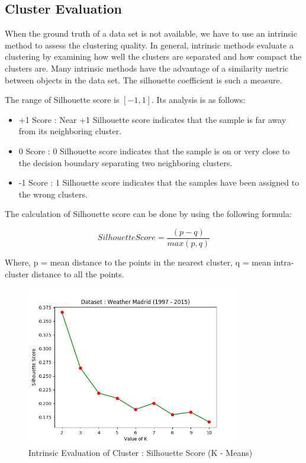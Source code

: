 \documentclass[12pt]{article}
\begin{document}
\subsection{Cluster Evaluation}

When the ground truth of a data set is not available, we have to use an intrinsic method to assess the clustering quality. In general, intrinsic methods evaluate a clustering by examining how well the clusters are separated and how compact the clusters are. Many intrinsic methods have the advantage of a similarity metric between objects in the data set. The silhouette coefficient is such a measure.

The range of Silhouette score is $ [-1, 1] $. Its analysis is as follows:

\begin{itemize}
	\item +1 Score : Near +1 Silhouette score indicates that the sample is far away from its neighboring cluster.
	
	\item 0 Score : 0 Silhouette score indicates that the sample is on or very close to the decision boundary separating two neighboring clusters.
	
	\item -1 Score : 1 Silhouette score indicates that the samples have been assigned to the wrong clusters.   
\end{itemize}

The calculation of Silhouette score can be done by using the following formula:

\begin{equation}
Silhouette Score = \frac{(p - q)}{max(p,q)}
\end{equation}


Where,
p = mean distance to the points in the nearest cluster,
q = mean intra-cluster distance to all the points.

\begin{figure}[H]
	\centering
	\includegraphics[width = 0.75\linewidth, height = 7cm]{eval_weather.png}
	\caption{Intrinsic Evaluation of Cluster : Silhouette Score (K - Means)}
	\label{fig:eval_w}
\end{figure}
\end{document}
